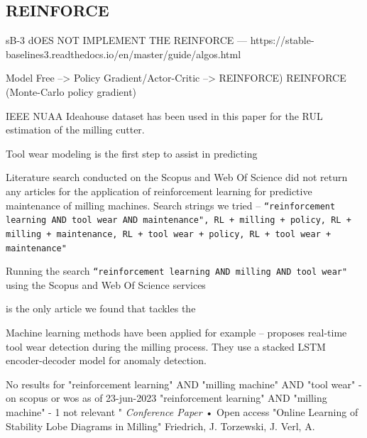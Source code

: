 \documentclass[a4paper, 12pt]{article}
\begin{document}

\subsection{REINFORCE}
sB-3 dOES NOT IMPLEMENT THE REINFORCE	 --- https://stable-baselines3.readthedocs.io/en/master/guide/algos.html

Model Free --> Policy Gradient/Actor-Critic --> REINFORCE)
REINFORCE (Monte-Carlo policy gradient) 


IEEE NUAA Ideahouse dataset has been used in this paper for the RUL estimation of the milling cutter. \cite{NUAA-data-set}



Tool wear modeling is the first step to assist in predicting 


Literature search conducted on the Scopus\texttrademark{} and Web Of Science\texttrademark{} did not return any articles for the application of reinforcement learning for predictive maintenance of milling machines. Search strings we tried -- \texttt{``reinforcement learning AND tool wear AND maintenance", RL + milling + policy, RL + milling + maintenance, RL + tool wear + policy, RL + tool wear + maintenance"} 

Running the search \texttt{``reinforcement learning AND milling AND tool wear"} using the Scopus\texttrademark{} and Web Of Science\texttrademark{} services 

\cite{dai2021reinforcement} is the only article we found that tackles the 

Machine learning methods have been applied for example --
\cite{oshida2023development} proposes real-time tool wear detection during the milling process. They use a stacked LSTM encoder-decoder model for anomaly detection.


No results for "reinforcement learning" AND "milling machine" AND "tool wear" - on scopus or wos as of 23-jun-2023
"reinforcement learning" AND "milling machine" - 1 not relevant "	
\textit{Conference Paper}  •  Open access "Online Learning of Stability Lobe Diagrams in Milling" 	
Friedrich, J. Torzewski, J.  Verl, A.
\end{document}
